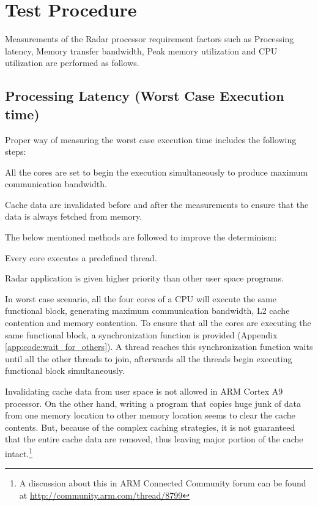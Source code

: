 \section{Test Procedure} 
\label{sec:mm:test_procedure}
Measurements of the Radar processor requirement factors such as Processing latency, Memory transfer bandwidth, Peak memory utilization and CPU utilization are performed as follows.

\subsection{Processing Latency (Worst Case Execution time)}
\label{ss:mm:latency}
Proper way of measuring the worst case execution time includes the following steps:
\begin{compactitem} 
	\item All the cores are set to begin the execution simultaneously to produce maximum communication bandwidth.
	\item Cache data are invalidated before and after the measurements to ensure that the data is always fetched from memory.
\end{compactitem} 

\noindent
The below mentioned methods are followed to improve the determinism:
\begin{compactitem} 
	\item Every core executes a predefined thread.
	\item Radar application is given higher priority than other user space programs. \\
\end{compactitem} 

In worst case scenario, all the four cores of a CPU will execute the same functional block, generating maximum communication bandwidth, L2 cache contention and memory contention. To ensure that all the cores are executing the same functional block, a synchronization function is provided (Appendix \ref{app:code:wait_for_others}). A thread reaches this synchronization function waits until all the other threads to join, afterwards all the threads begin executing functional block simultaneously.

Invalidating cache data from user space is not allowed in ARM Cortex A9 processor. On the other hand, writing a program that copies huge junk of data from one memory location to other memory location seems to clear the cache contents. But, because of the complex caching strategies, it is not guaranteed that the entire cache data are removed, thus leaving major portion of the cache intact.\footnote{A discussion about this in ARM Connected Community forum can be found at \url{http://community.arm.com/thread/8799}} 

